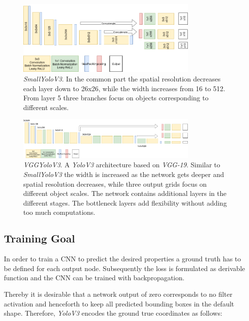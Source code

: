 \begin{figure}[hbtp]
	\centering
	\includegraphics[width=0.8\textwidth]{fig/SmallYoloV3}
	\caption{\textit{SmallYoloV3}. In the common part the spatial resolution decreases each layer down to 26x26, while the width increases from 16 to 512. From layer 5 three branches focus on objects corresponding to different scales. }
	\label{fig:tinyyolov3_arch}
\end{figure}

\begin{figure}[hbtp]
	\centering
	\includegraphics[width=0.8\textwidth]{fig/VGGYoloV3}
	\caption{\textit{VGGYoloV3}. A \textit{YoloV3} architecture based on \textit{VGG-19}. Similar to \textit{SmallYoloV3} the width is increased as the network gets deeper and spatial resolution decreases, while three output grids focus on different object scales. The network contains additional layers in the different stages. The bottleneck layers add flexibility without adding too much computations. }
	\label{fig:vggyolov3_arch}
\end{figure}

\subsection{Training Goal}

In order to train a \ac{CNN} to predict the desired properties a ground truth has to be defined for each output node. Subsequently the loss is formulated as derivable function and the \ac{CNN} can be trained with backpropagation.

Thereby it is desirable that a network output of zero corresponds to no filter activation and henceforth to keep all predicted bounding boxes in the default shape. Therefore, \textit{YoloV3} encodes the ground true coordinates as follows:


